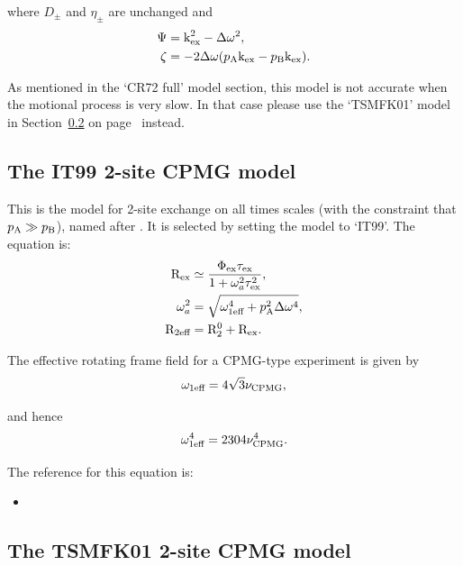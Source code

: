 where $D_\pm$ and $\eta_\pm$ are unchanged and
\begin{align}
    \Psi  &= \textrm{k}_\textrm{ex}^2 - \Delta\omega^2 , \\
    \zeta &= -2\Delta\omega (p_\textrm{A}\textrm{k}_\textrm{ex} - p_\textrm{B}\textrm{k}_\textrm{ex}) .
\end{align}

As mentioned in the `CR72 full' model section, this model is not accurate when the motional process is very slow.
In that case please use the `TSMFK01' model in Section~\ref{sect: dispersion: TSMFK01 model} on page~\pageref{sect: dispersion: TSMFK01 model} instead.



\subsection{The IT99 2-site CPMG model}
\label{sect: dispersion: IT99 model}

This is the model for 2-site exchange on all times scales (with the constraint that $p_\textrm{A} \gg p_\textrm{B}$), named after \citet{IshimaTorchia99}.  It is selected by setting the model to `IT99'.  The equation is:
\begin{align}
    \mathrm{R}_\textrm{ex}       &\simeq \frac{\Phi_\textrm{ex}\tau_\textrm{ex}}{1 + \omega_a^2\tau_\textrm{ex}^2} , \\
    \omega_a^2 &= \sqrt{\omega_\textrm{1eff}^4 + p_\textrm{A}^2\Delta\omega^4} , \\
    \mathrm{R}_\textrm{2eff}   &= \mathrm{R}_2^0 + \mathrm{R}_\textrm{ex} .
\end{align}

The effective rotating frame field for a CPMG-type experiment is given by
\begin{equation}
    \omega_\textrm{1eff} = 4\sqrt{3}\nu_\textrm{CPMG} ,
\end{equation}

and hence
\begin{equation}
    \omega_\textrm{1eff}^4 = 2304\nu_\textrm{CPMG}^4 .
\end{equation}

The reference for this equation is:
\begin{itemize}
\item {}
\end{itemize}




\subsection{The TSMFK01 2-site CPMG model}
\label{sect: dispersion: TSMFK01 model}



